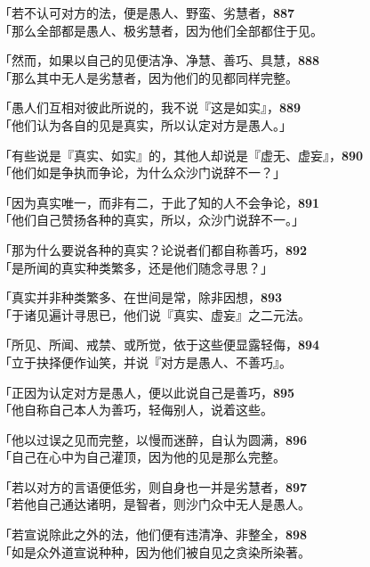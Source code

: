 「若不认可对方的法，便是愚人、野蛮、劣慧者，\hfill{\grayfootnotesize \textbf{887}} \\
「那么全部都是愚人、极劣慧者，因为他们全部都住于见。


「然而，如果以自己的见便洁净、净慧、善巧、具慧，\hfill{\grayfootnotesize \textbf{888}} \\
「那么其中无人是劣慧者，因为他们的见都同样完整。


「愚人们互相对彼此所说的，我不说『这是如实』，\hfill{\grayfootnotesize \textbf{889}} \\
「他们认为各自的见是真实，所以认定对方是愚人。」


「有些说是『真实、如实』的，其他人却说是『虚无、虚妄』，\hfill{\grayfootnotesize \textbf{890}} \\
「他们如是争执而争论，为什么众沙门说辞不一？」


「因为真实唯一，而非有二，于此了知的人不会争论，\hfill{\grayfootnotesize \textbf{891}} \\
「他们自己赞扬各种的真实，所以，众沙门说辞不一。」


「那为什么要说各种的真实？论说者们都自称善巧，\hfill{\grayfootnotesize \textbf{892}} \\
「是所闻的真实种类繁多，还是他们随念寻思？」


「真实并非种类繁多、在世间是常，除非因想，\hfill{\grayfootnotesize \textbf{893}} \\
「于诸见遍计寻思已，他们说『真实、虚妄』之二元法。


「所见、所闻、戒禁、或所觉，依于这些便显露轻侮，\hfill{\grayfootnotesize \textbf{894}} \\
「立于抉择便作讪笑，并说『对方是愚人、不善巧』。


「正因为认定对方是愚人，便以此说自己是善巧，\hfill{\grayfootnotesize \textbf{895}} \\
「他自称自己本人为善巧，轻侮别人，说着这些。


「他以过误之见而完整，以慢而迷醉，自认为圆满，\hfill{\grayfootnotesize \textbf{896}} \\
「自己在心中为自己灌顶，因为他的见是那么完整。


「若以对方的言语便低劣，则自身也一并是劣慧者，\hfill{\grayfootnotesize \textbf{897}} \\
「若他自己通达诸明，是智者，则沙门众中无人是愚人。


「若宣说除此之外的法，他们便有违清净、非整全，\hfill{\grayfootnotesize \textbf{898}} \\
「如是众外道宣说种种，因为他们被自见之贪染所染著。


